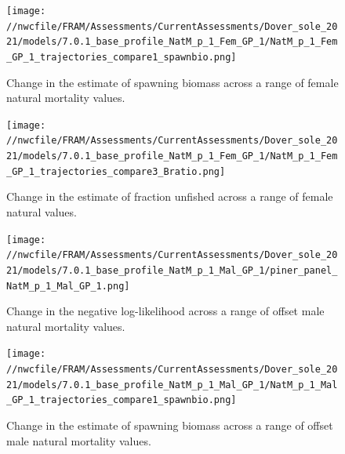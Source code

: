 \documentclass[11pt,
  english,
  a4paper,
]{article}
\begin{document}
\tagmcend\tagstructend


\begin{figure}
\centering
\texttt{[image: //nwcfile/FRAM/Assessments/CurrentAssessments/Dover\_sole\_2021/models/7.0.1\_base\_profile\_NatM\_p\_1\_Fem\_GP\_1/NatM\_p\_1\_Fem\_GP\_1\_trajectories\_compare1\_spawnbio.png]}
\caption{Change in the estimate of spawning biomass across a range of female natural mortality values.\label{fig:m-ssb}}
\end{figure}

\tagmcend\tagstructend


\begin{figure}
\centering
\texttt{[image: //nwcfile/FRAM/Assessments/CurrentAssessments/Dover\_sole\_2021/models/7.0.1\_base\_profile\_NatM\_p\_1\_Fem\_GP\_1/NatM\_p\_1\_Fem\_GP\_1\_trajectories\_compare3\_Bratio.png]}
\caption{Change in the estimate of fraction unfished across a range of female natural values.\label{fig:m-depl}}
\end{figure}

\tagmcend\tagstructend


\begin{figure}
\centering
\texttt{[image: //nwcfile/FRAM/Assessments/CurrentAssessments/Dover\_sole\_2021/models/7.0.1\_base\_profile\_NatM\_p\_1\_Mal\_GP\_1/piner\_panel\_NatM\_p\_1\_Mal\_GP\_1.png]}
\caption{Change in the negative log-likelihood across a range of offset male natural mortality values.\label{fig:m-male-profile}}
\end{figure}

\tagmcend\tagstructend


\begin{figure}
\centering
\texttt{[image: //nwcfile/FRAM/Assessments/CurrentAssessments/Dover\_sole\_2021/models/7.0.1\_base\_profile\_NatM\_p\_1\_Mal\_GP\_1/NatM\_p\_1\_Mal\_GP\_1\_trajectories\_compare1\_spawnbio.png]}
\caption{Change in the estimate of spawning biomass across a range of offset male natural mortality values.\label{fig:m-male-ssb}}
\end{figure}
\end{document}
